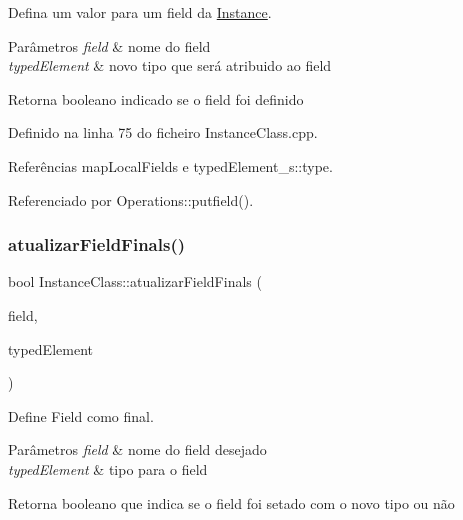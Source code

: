 Defina um valor para um field da \hyperlink{classInstance}{Instance}. 


\begin{DoxyParams}{Parâmetros}
{\em field} & nome do field \\
\hline
{\em typed\+Element} & novo tipo que será atribuido ao field \\
\hline
\end{DoxyParams}
\begin{DoxyReturn}{Retorna}
booleano indicado se o field foi definido 
\end{DoxyReturn}


Definido na linha 75 do ficheiro Instance\+Class.\+cpp.



Referências map\+Local\+Fields e typed\+Element\+\_\+s\+::type.



Referenciado por Operations\+::putfield().

\mbox{\label{classInstanceClass_a05a47d4bf656908ce3dacc53d9d791b2}} 
\subsubsection{\texorpdfstring{atualizar\+Field\+Finals()}{atualizarFieldFinals()}}
{\footnotesize\ttfamily bool Instance\+Class\+::atualizar\+Field\+Finals (\begin{DoxyParamCaption}\item[{string}]{field,  }\item[{\hyperlink{BasicTypes_8h_a97b332303b1262282599e6ede0637b82}{Typed\+Element}}]{typed\+Element }\end{DoxyParamCaption})}



Define Field como final. 


\begin{DoxyParams}{Parâmetros}
{\em field} & nome do field desejado \\
\hline
{\em typed\+Element} & tipo para o field \\
\hline
\end{DoxyParams}
\begin{DoxyReturn}{Retorna}
booleano que indica se o field foi setado com o novo tipo ou não 
\end{DoxyReturn}


